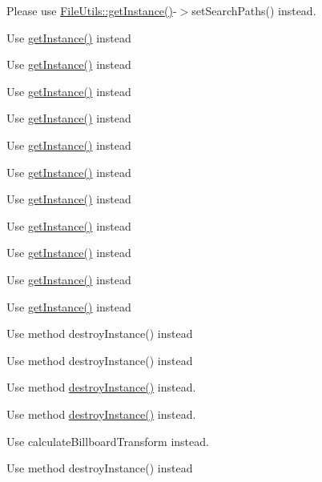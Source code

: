 \begin{DoxyRefList}
Please use \hyperlink{classFileUtils_ac8ced4394d59f5459445ced27ccd0e8a}{File\+Utils\+::get\+Instance()}-\/$>$set\+Search\+Paths() instead.  
\item[\label{deprecated__deprecated000113}%
\Hypertarget{deprecated__deprecated000113}%
Member \hyperlink{classApplication_aa20c8b14353e12b2f35e147896dd322e}{Application\+:\+:shared\+Application} ()]Use \hyperlink{classApplication_a723b8bba6edce3769a8d771770ca10e1}{get\+Instance()} instead 

Use \hyperlink{classApplication_a723b8bba6edce3769a8d771770ca10e1}{get\+Instance()} instead 

Use \hyperlink{classApplication_a723b8bba6edce3769a8d771770ca10e1}{get\+Instance()} instead 

Use \hyperlink{classApplication_a723b8bba6edce3769a8d771770ca10e1}{get\+Instance()} instead 

Use \hyperlink{classApplication_a723b8bba6edce3769a8d771770ca10e1}{get\+Instance()} instead 

Use \hyperlink{classApplication_a723b8bba6edce3769a8d771770ca10e1}{get\+Instance()} instead 

Use \hyperlink{classApplication_a723b8bba6edce3769a8d771770ca10e1}{get\+Instance()} instead 

Use \hyperlink{classApplication_a723b8bba6edce3769a8d771770ca10e1}{get\+Instance()} instead 

Use \hyperlink{classApplication_a723b8bba6edce3769a8d771770ca10e1}{get\+Instance()} instead 

Use \hyperlink{classApplication_a723b8bba6edce3769a8d771770ca10e1}{get\+Instance()} instead 

Use \hyperlink{classApplication_a723b8bba6edce3769a8d771770ca10e1}{get\+Instance()} instead  
\item[\label{deprecated__deprecated000083}%
\Hypertarget{deprecated__deprecated000083}%
Member \hyperlink{classArmatureNodeReader_a9cb29fa475333529d6b91f75f7ef0b41}{Armature\+Node\+Reader\+:\+:purge} ()]Use method destroy\+Instance() instead 

Use method destroy\+Instance() instead  
\item[\label{deprecated__deprecated000048}%
\Hypertarget{deprecated__deprecated000048}%
Member \hyperlink{classAsyncTaskPool_a9e0a8926935d80cf5ce73ac7d748a4ae}{Async\+Task\+Pool\+:\+:destory\+Instance} ()]Use method \hyperlink{classAsyncTaskPool_a3197eae4bc1c9f17fa2869cf70b7bad4}{destroy\+Instance()} instead. 

Use method \hyperlink{classAsyncTaskPool_a3197eae4bc1c9f17fa2869cf70b7bad4}{destroy\+Instance()} instead.  
\item[\label{deprecated__deprecated000279}%
\Hypertarget{deprecated__deprecated000279}%
Member \hyperlink{classBillBoard_a8ae4248e8b3700d1c40fbc7b212ca95d}{Bill\+Board\+:\+:calculate\+Billbaord\+Transform} ()]Use calculate\+Billboard\+Transform instead.  
\item[\label{deprecated__deprecated000102}%
\Hypertarget{deprecated__deprecated000102}%
Member \hyperlink{classBoneNodeReader_a66289ba52e63fd281967b75781cb16bc}{Bone\+Node\+Reader\+:\+:purge} ()]Use method destroy\+Instance() instead 


\end{DoxyRefList}
